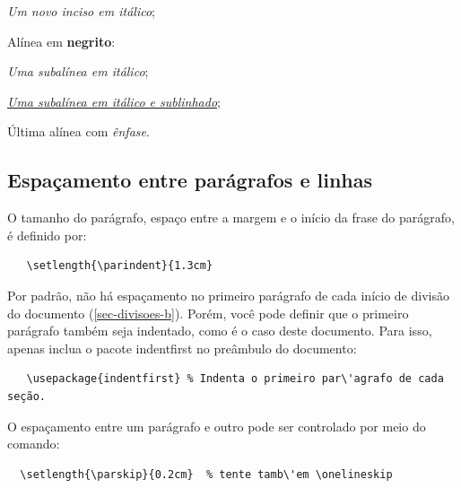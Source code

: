 \begin{alineas}
  \begin{incisos}
    \item \textit{Um novo inciso em it\'alico};
  \end{incisos}
  
  \item Alínea em \textbf{negrito}:
  
  \begin{subalineas}
    \item \textit{Uma subalínea em it\'alico};
    \item \underline{\textit{Uma subalínea em it\'alico e sublinhado}}; 
  \end{subalineas}
  
  \item Última alínea com \emph{\^enfase}.
  
\end{alineas}

\subsection{Espaçamento entre par\'agrafos e linhas}\label{sec_espacamento}

O tamanho do par\'agrafo, espaço entre a margem
e o início da frase do par\'agrafo, \'e definido por:

\begin{verbatim}
   \setlength{\parindent}{1.3cm}
\end{verbatim}

Por padrão, não h\'a espaçamento no
primeiro par\'agrafo de cada início de divisão do documento
(\autoref{sec-divisoes-b}). Por\'em, voc\^e pode definir que o primeiro par\'agrafo
tamb\'em seja indentado, como \'e o caso deste documento. Para isso, apenas inclua o
pacote \textsf{indentfirst} no pre\^ambulo do documento:

\begin{verbatim}
   \usepackage{indentfirst} % Indenta o primeiro par\'agrafo de cada seção.
\end{verbatim}

O espaçamento entre um par\'agrafo e outro
pode ser controlado por meio do comando:

\begin{verbatim}
  \setlength{\parskip}{0.2cm}  % tente tamb\'em \onelineskip
\end{verbatim}

